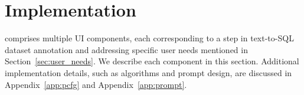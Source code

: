 \section{Implementation}




{\tool} comprises multiple UI components, each corresponding to a step in text-to-SQL dataset annotation and addressing specific user needs mentioned in Section~\ref{sec:user_needs}. 
We describe each component in this section. 
Additional implementation details, such as algorithms and prompt design, are discussed in Appendix~\ref{app:pcfg} and Appendix~\ref{app:prompt}.

